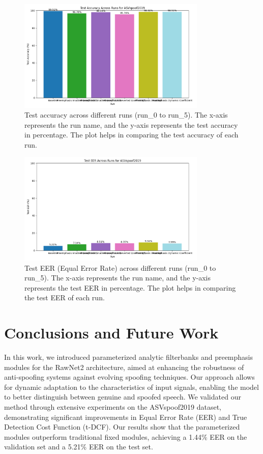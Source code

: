 \documentclass{article} %
\begin{document}
\begin{figure}[h]
    \centering
    \includegraphics[width=0.8\textwidth]{test_accuracy_ASVspoof2019_across_runs.png}
    \caption{Test accuracy across different runs (run\_0 to run\_5). The x-axis represents the run name, and the y-axis represents the test accuracy in percentage. The plot helps in comparing the test accuracy of each run.}
    \label{fig:test_accuracy}
\end{figure}

\begin{figure}[h]
    \centering
    \includegraphics[width=0.8\textwidth]{test_eer_ASVspoof2019_across_runs.png}
    \caption{Test EER (Equal Error Rate) across different runs (run\_0 to run\_5). The x-axis represents the run name, and the y-axis represents the test EER in percentage. The plot helps in comparing the test EER of each run.}
    \label{fig:test_eer}
\end{figure}

\section{Conclusions and Future Work}
\label{sec:conclusion}
In this work, we introduced parameterized analytic filterbanks and preemphasis modules for the RawNet2 architecture, aimed at enhancing the robustness of anti-spoofing systems against evolving spoofing techniques. Our approach allows for dynamic adaptation to the characteristics of input signals, enabling the model to better distinguish between genuine and spoofed speech. We validated our method through extensive experiments on the ASVspoof2019 dataset, demonstrating significant improvements in Equal Error Rate (EER) and True Detection Cost Function (t-DCF). Our results show that the parameterized modules outperform traditional fixed modules, achieving a 1.44\% EER on the validation set and a 5.21\% EER on the test set.
\end{document}
